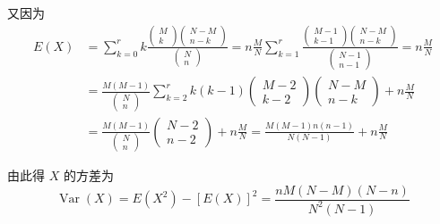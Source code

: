 又因为
\[
\begin{array}{ll}
{E(X)} & {=\sum_{k=0}^{r} k \frac{\left( \begin{array}{c}{M} \\
		{k}
		\end{array}
		\right) \left( 
		\begin{array}{c}
		{N-M} \\ 
		{n-k}
		\end{array}
		\right)}{\left( 
		\begin{array}{c}
		{N} \\ 
		{n}
		\end{array}
		\right)}=n \frac{M}{N} \sum_{k=1}^{r} \frac{\left( \begin{array}{c}
		{M-1} \\ 
		{k-1}
		\end{array}
		\right) \left( 
		\begin{array}{c}
		{N-M} \\ 
		{n-k}
		\end{array}
		\right)}{\left( 
		\begin{array}{c}
		{N-1} \\ 
		{n-1}
		\end{array}
		\right)}=n \frac{M}{N}} \\
{} & {=\frac{M(M-1)}{\left( 
		\begin{array}{l}{N} \\ 
		{n}
		\end{array}
		\right)} \sum_{k=2}^{r} k(k-1) \left( 
	\begin{array}{c}
	{M-2} \\ 
	{k-2}
	\end{array}
	\right) \left( 
	\begin{array}{c}{N-M} \\ 
	{n-k}
	\end{array}
	\right)+n \frac{M}{N}} \\
{} & {=\frac{M(M-1)}{\left( 
		\begin{array}{l}
		{N} \\ 
		{n}\end{array}
		\right)} \left( 
	\begin{array}{l}
	{N-2} \\ 
	{n-2}
	\end{array}
	\right)+n \frac{M}{N}=\frac{M(M-1) n(n-1)}{N(N-1)}+n \frac{M}{N}} 
\end{array}
\]

由此得 $ X $ 的方差为
\[
\operatorname{Var}(X)=E\left(X^{2}\right)-[E(X)]^{2}=\frac{n M(N-M)(N-n)}{N^{2}(N-1)}
\]


